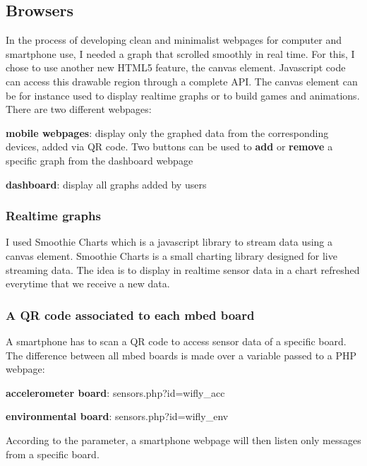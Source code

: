 \documentclass[pdftex,10pt,a4paper]{report}
\newenvironment{packed_item}{
\begin{itemize}
  \setlength{\itemsep}{1pt}
  \setlength{\parskip}{0pt}
  \setlength{\parsep}{0pt}
}{\end{itemize}}
\begin{document}
\subsection{Browsers}
In the process of developing clean and minimalist webpages for computer and smartphone use, I needed a graph that scrolled smoothly in real time. For this, I chose to use another new HTML5 feature, the canvas element. Javascript code can access this drawable region through a complete API. The canvas element can be for instance used to display realtime graphs or to build games and animations.
\\


There are two different webpages:
\begin{packed_item}
	\item \textbf{mobile webpages}: display only the graphed data from the corresponding devices, added via QR code. Two buttons can be used to \textbf{add} or \textbf{remove} a specific graph from the dashboard webpage
	\item \textbf{dashboard}: display all graphs added by users
\end{packed_item}

\subsubsection{Realtime graphs}
I used Smoothie Charts which is a javascript library to stream data using a canvas element. Smoothie Charts is a small charting library designed for live streaming data. The idea is to display in realtime sensor data in a chart refreshed everytime that we receive a new data.

\subsubsection{A QR code associated to each mbed board}
A smartphone has to scan a QR code to access sensor data of a specific board. The difference between all mbed boards is made over a variable passed to a PHP webpage:
\begin{packed_item}
	\item \textbf{accelerometer board}: sensors.php?id=wifly\_acc
	\item \textbf{environmental board}: sensors.php?id=wifly\_env
\end{packed_item}

According to the parameter, a smartphone webpage will then listen only messages from a specific board.
\end{document}
